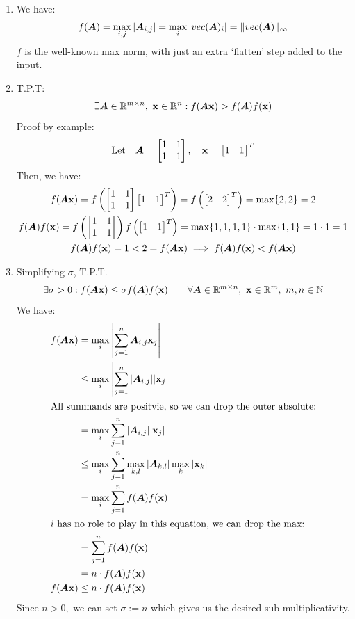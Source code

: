 \documentclass[]{exam}
\begin{document}
\begin{questions}
\begin{enumerate}[label=\arabic*.]
	\item We have:
		\begin{gather*}
			f(\boldsymbol{A}) = \max_{i,j} | \boldsymbol{A}_{i,j}| = \max_{i} | vec(\boldsymbol{A})_i| = \| vec(\boldsymbol{A}) \|_{\infty}
		\end{gather*}
		$f$ is the well-known max norm, with just an extra `flatten' step added to the input.
	\item T.P.T:
		\begin{equation*}
			\exists \boldsymbol{A} \in \mathbb{R}^{m \times n},~\boldsymbol{\mathrm{x}} \in \mathbb{R}^{n} : f(\boldsymbol{A} \boldsymbol{\mathrm{x}}) > f(\boldsymbol{A}) f(\boldsymbol{\mathrm{x}})
		\end{equation*}
		Proof by example:
		\begin{gather*}
			\mathrm{Let} \quad \boldsymbol{A} = \begin{bmatrix} 1 & 1 \\ 1 & 1 \end{bmatrix}, \quad \boldsymbol{\mathrm{x}} = \begin{bmatrix} 1 & 1 \end{bmatrix}^T
		\end{gather*}
		Then, we have:
		\begin{gather*}
			f(\boldsymbol{A} \boldsymbol{\mathrm{x}}) = f\left(\begin{bmatrix} 1 & 1 \\ 1 & 1 \end{bmatrix} \begin{bmatrix} 1 & 1 \end{bmatrix}^T \right) = f\left( \begin{bmatrix} 2 & 2 \end{bmatrix}^T \right) = \max \{2, 2\} = 2 \\
			f(\boldsymbol{A}) f(\boldsymbol{\mathrm{x}}) = f\left(\begin{bmatrix} 1 & 1 \\ 1 & 1 \end{bmatrix}\right) f \left(\begin{bmatrix} 1 & 1 \end{bmatrix}^T \right) = \max \{1, 1, 1, 1\} \cdot \max\{1, 1\} = 1 \cdot 1 = 1 \\
			f(\boldsymbol{A}) f(\boldsymbol{\mathrm{x}}) = 1 < 2 = f(\boldsymbol{A} \boldsymbol{\mathrm{x}}) \implies f(\boldsymbol{A}) f(\boldsymbol{\mathrm{x}}) < f(\boldsymbol{A} \boldsymbol{\mathrm{x}})
		\end{gather*}
	\item Simplifying $\sigma$, T.P.T.
		\begin{gather*}
			\exists \sigma > 0: f(\boldsymbol{A} \boldsymbol{\mathrm{x}}) \leq \sigma f(\boldsymbol{A}) f(\boldsymbol{\mathrm{x}}) \qquad \forall \boldsymbol{A} \in \mathbb{R}^{m \times n},~\boldsymbol{\mathrm{x}} \in \mathbb{R}^m,~m, n \in \mathbb{N}
		\end{gather*}
		We have:
		\begin{align*}
			f(\boldsymbol{A} \boldsymbol{\mathrm{x}}) &= \max_{i} \left| \sum^{n}_{j=1} \boldsymbol{A}_{i,j} \boldsymbol{\mathrm{x}}_j \right| \\
			&\leq \max_{i} \left| \sum^{n}_{j=1} |\boldsymbol{A}_{i,j}| |\boldsymbol{\mathrm{x}}_j| \right| \\
			\intertext{All summands are positvie, so we can drop the outer absolute:}
			&= \max_{i} \sum^{n}_{j=1} |\boldsymbol{A}_{i,j}| |\boldsymbol{\mathrm{x}}_j| \\
			&\leq \max_{i} \sum^{n}_{j=1} \max_{k,l}|\boldsymbol{A}_{k,l}| \max_k|\boldsymbol{\mathrm{x}}_k| \\
			&= \max_{i} \sum^{n}_{j=1} f(\boldsymbol{A}) f(\boldsymbol{\mathrm{x}}) \\
			\intertext{$i$ has no role to play in this equation, we can drop the max:}
			&= \sum^{n}_{j=1} f(\boldsymbol{A}) f(\boldsymbol{\mathrm{x}}) \\
			&= n \cdot f(\boldsymbol{A}) f(\boldsymbol{\mathrm{x}}) \\
			f(\boldsymbol{A} \boldsymbol{\mathrm{x}}) &\leq n \cdot f(\boldsymbol{A}) f(\boldsymbol{\mathrm{x}})
		\end{align*}
		Since $n > 0,$ we can set $\sigma := n$ which gives us the desired sub-multiplicativity.
\end{enumerate}


\end{questions}
\end{document}
